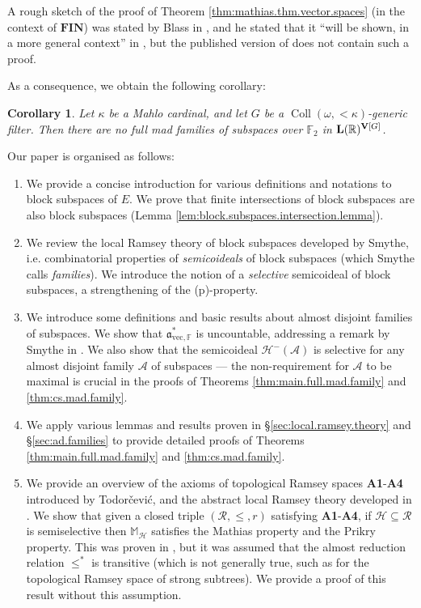\documentclass[11pt,reqno]{amsart}
\theoremstyle{plain}
\numberwithin{equation}{section}
\newtheorem{corollary}[theorem]{Corollary}
\theoremstyle{definition}
\newcommand{\func}{\operatorname}
\newcommand{\R}{\mathbb{R}}
\newcommand{\cal}{\mathcal}
\renewcommand{\frak}{\mathfrak}
\renewcommand{\bf}{\mathbf}
\newcommand{\A}{\cal{A}}
\newcommand{\Coll}{\func{Coll}}
\newcommand{\FIN}{\bf{FIN}}
\newcommand{\V}{\bf{V}}
\renewcommand{\H}{\cal{H}}
\newcommand{\avec}{\frak{a}_{\mathrm{vec},\mathbb{F}}}
\let\strokeL\L
\DeclareRobustCommand{\L}{\ifmmode\mathbf{L}\else\strokeL\fi}
\let\Sec\S
\renewcommand{\S}{\mathcal{S}}
\begin{document}
A rough sketch of the proof of Theorem \ref{thm:mathias.thm.vector.spaces} (in the context of $\FIN$) was stated by Blass in \cite{B87}, and he stated that it ``will be shown, in a more general context'' in \cite{B88}, but the published version of \cite{B88} does not contain such a proof. 

As a consequence, we obtain the following corollary:
\begin{corollary}
\label{cor:no.full.mad.family.in.L(R)}
    Let $\kappa$ be a Mahlo cardinal, and let $G$ be a $\Coll(\omega,<\!\kappa)$-generic filter. Then there are no full mad families of subspaces over $\mathbb{F}_2$ in $\L(\R)^{\V[G]}$.
\end{corollary}

Our paper is organised as follows:
\begin{enumerate}
    \item[(\Sec\ref{sec:setup})] We provide a concise introduction for various definitions and notations to block subspaces of $E$. We prove that finite intersections of block subspaces are also block subspaces (Lemma \ref{lem:block.subspaces.intersection.lemma}).
    
    \item[(\Sec\ref{sec:local.ramsey.theory})] We review the local Ramsey theory of block subspaces developed by Smythe, i.e. combinatorial properties of \emph{semicoideals} of block subspaces (which Smythe calls \emph{families}). We introduce the notion of a \emph{selective} semicoideal of block subspaces, a strengthening of the (p)-property. 
    
    \item[(\Sec\ref{sec:ad.families})] We introduce some definitions and basic results about almost disjoint families of subspaces. We show that $\avec^*$ is uncountable, addressing a remark by Smythe in \cite{S19}. We also show that the semicoideal $\H^-(\A)$ is selective for any almost disjoint family $\A$ of subspaces --- the non-requirement for $\A$ to be maximal is crucial in the proofs of Theorems \ref{thm:main.full.mad.family} and \ref{thm:cs.mad.family}.
    
    \item[(\Sec\ref{sec:full.mad.families})] We apply various lemmas and results proven in \Sec\ref{sec:local.ramsey.theory} and \Sec\ref{sec:ad.families} to provide detailed proofs of Theorems \ref{thm:main.full.mad.family} and \ref{thm:cs.mad.family}.
    
    \item[(\Sec\ref{sec:TRS.and.abstract.mathias.forcing})] We provide an overview of the axioms of topological Ramsey spaces \textbf{A1}-\textbf{A4} introduced by Todor\v{c}evi\'{c}, and the abstract local Ramsey theory developed in \cite{DMN15}. We show that given a closed triple $(\cal{R},\leq,r)$ satisfying \textbf{A1}-\textbf{A4}, if $\H \subseteq \cal{R}$ is semiselective then $\mathbb{M}_\H$ satisfies the Mathias property and the Prikry property. This was proven in \cite{DMN15}, but it was assumed that the almost reduction relation $\leq^*$ is transitive (which is not generally true, such as for the topological Ramsey space of strong subtrees). We provide a proof of this result without this assumption.
    

\end{enumerate}
\end{document}
